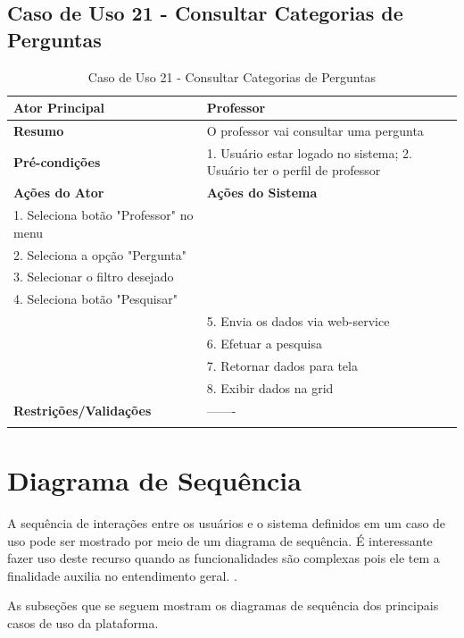 \subsection{Caso de Uso 21 - Consultar Categorias de Perguntas}
\label{sc:case21}
\begin{center}
\begin{longtable}{p{8cm}|p{8cm}}
    \hline
    \textbf{Ator Principal} & Professor \\
    \hline
    \textbf{Resumo} & O professor vai consultar uma pergunta \\
    \hline
    \textbf{Pr\'{e}-condi\c{c}\~{o}es} & 1. Usuário estar logado no sistema; 2. Usuário ter o perfil de professor \\
    \hline
    \textbf{A\c{c}\~{o}es do Ator} & \textbf{A\c{c}\~{o}es do Sistema} \\
    \hline
    1. Seleciona botão "Professor" no menu \\
    \hline
    2. Seleciona a opção "Pergunta" \\
	\hline
    3. Selecionar o filtro desejado \\
	\hline
    4. Seleciona botão "Pesquisar" \\
    \hline
    & 5. Envia os dados via web-service \\
	\hline
    & 6. Efetuar a pesquisa \\
	\hline
    & 7. Retornar dados para tela \\
	\hline
    & 8. Exibir dados na grid \\
    \hline
    \hline
    \textbf{Restri\c{c}\~{o}es/Valida\c{c}\~{o}es} & -------\\
\hline
\caption{Caso de Uso 21 - Consultar Categorias de Perguntas}
\end{longtable}
\end{center}



\section{Diagrama de Sequência}
\label{sc:diagramaSequencia}

A sequência de interações entre os usuários e o sistema definidos em um caso de uso pode ser mostrado por meio de um diagrama de sequência. É interessante fazer uso deste recurso quando as funcionalidades são complexas pois ele tem a finalidade auxilia no entendimento geral. \citep{SOMMERVILLE2011}.

As subseções que se seguem mostram os diagramas de sequência dos principais casos de uso da plataforma.


